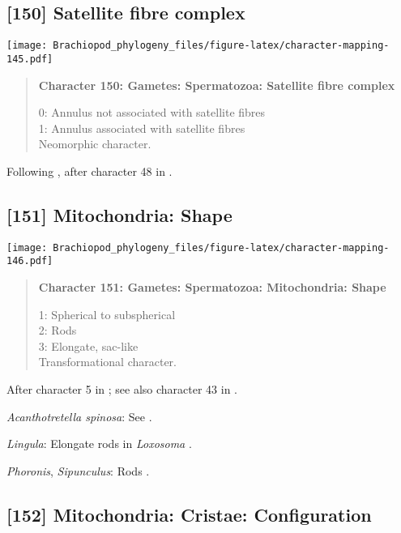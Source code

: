 \documentclass[openany]{book}
\theoremstyle{definition}
\theoremstyle{definition}
\theoremstyle{definition}
\theoremstyle{remark}
\begin{document}
\subsection*{{[}150{]} Satellite fibre
complex}\label{satellite-fibre-complex}

\texttt{[image: Brachiopod\_phylogeny\_files/figure-latex/character-mapping-145.pdf]}

\begin{quote}
\textbf{Character 150: Gametes: Spermatozoa: Satellite fibre complex}

0: Annulus not associated with satellite fibres\\
1: Annulus associated with satellite fibres\\
Neomorphic character.
\end{quote}

Following \citet{Smith2012}, after character 48 in \citet{Ponder1997}.

\subsection*{{[}151{]} Mitochondria: Shape}\label{mitochondria-shape}

\texttt{[image: Brachiopod\_phylogeny\_files/figure-latex/character-mapping-146.pdf]}

\begin{quote}
\textbf{Character 151: Gametes: Spermatozoa: Mitochondria: Shape}

1: Spherical to subspherical\\
2: Rods\\
3: Elongate, sac-like\\
Transformational character.
\end{quote}

After character 5 in \citet{BucklandNicks2008}; see also character 43 in
\citet{Ponder1997}.

\hypertarget{Acanthotretella_spinosa-coding-151}{}
\emph{Acanthotretella spinosa}: See \citet{BucklandNicks1988}.

\hypertarget{Lingula-coding-151}{}
\emph{Lingula}: Elongate rods in \emph{Loxosoma} \citep{Franzen2000}.

\hypertarget{Phoronis-coding-151}{}
\emph{Phoronis}, \emph{Sipunculus}: Rods \citep{Franzen1981}.

\subsection*{{[}152{]} Mitochondria: Cristae:
Configuration}\label{mitochondria-cristae-configuration}
\end{document}
